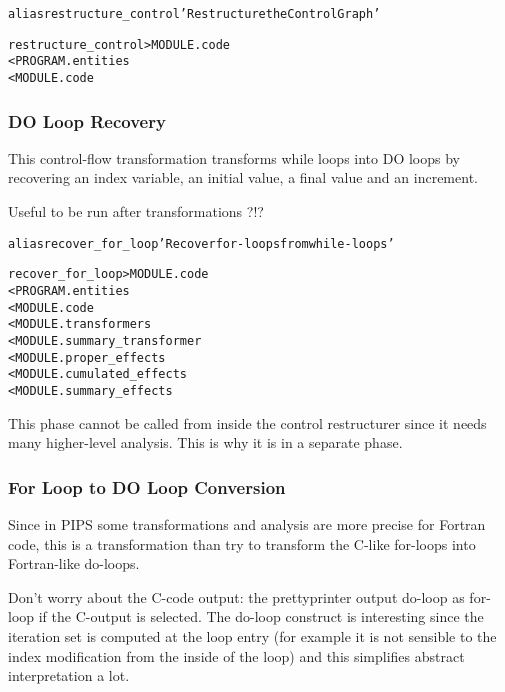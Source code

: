 \documentclass[a4paper]{report}
\newenvironment{PipsMake}{\begin{alltt}}{\end{alltt}}
\newenvironment{PipsPass}[1]{\label{pass:#1}}{}
\begin{document}
\begin{PipsMake}
alias restructure_control 'Restructure the Control Graph'

restructure_control          > MODULE.code
        < PROGRAM.entities
        < MODULE.code
\end{PipsMake}


\subsubsection{DO Loop Recovery}
\label{sec:loop-recovering}

\begin{PipsPass}{recover_for_loop}
This control-flow transformation transforms while loops into DO loops
by recovering an index variable, an initial value, a final value and
an increment.

Useful to be run after transformations ?!?
\end{PipsPass}

\begin{PipsMake}
alias recover_for_loop 'Recover for-loops from while-loops'

recover_for_loop          > MODULE.code
        < PROGRAM.entities
        < MODULE.code
        < MODULE.transformers
        < MODULE.summary_transformer
        < MODULE.proper_effects
        < MODULE.cumulated_effects
        < MODULE.summary_effects
\end{PipsMake}

This phase cannot be called from inside the control restructurer since it
needs many higher-level analysis. This is why it is in a separate phase.

\subsubsection{For Loop to DO Loop Conversion}
\label{sec:loop-do-loop}

\begin{PipsPass}{for_loop_to_do_loop}
Since in PIPS some transformations and analysis are more precise for
Fortran code, this is a transformation than try to transform the C-like
for-loops into Fortran-like do-loops.
\end{PipsPass}

Don't worry about the C-code output:
the prettyprinter output do-loop as for-loop if the C-output is selected.
The do-loop construct is interesting since the iteration set is computed
at the loop entry (for example it is not sensible to the index
modification from the inside of the loop) and this simplifies abstract
interpretation a lot.
\end{document}
